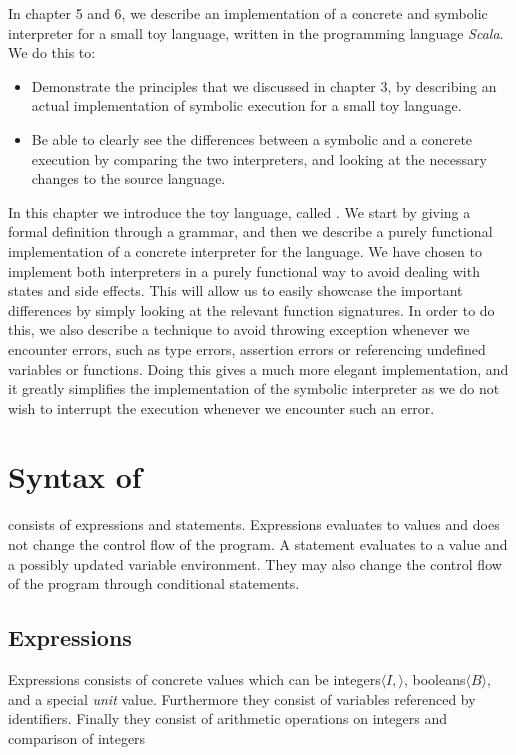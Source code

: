 
In chapter 5 and 6, we describe an implementation of a concrete and symbolic interpreter for a small toy language, written in the programming language \textsl{Scala}. We do this to: 
\begin{itemize}
	\item Demonstrate the principles that we discussed in chapter 3, by describing an actual implementation of symbolic execution for a small toy language.
	\item Be able to clearly see the differences between a symbolic and a concrete execution by comparing the two interpreters, and looking at the necessary changes to the source language. 
\end{itemize} 

In this chapter we introduce the toy language, called \explanguage. We start by giving a formal definition through a grammar, and then we describe a purely functional implementation of a concrete interpreter for the language. We have chosen to implement both interpreters in a purely functional way to avoid dealing with states and side effects. This will allow us to easily showcase the important differences by simply looking at the relevant function signatures. In order to do this, we also describe a technique to avoid throwing exception whenever we encounter errors, such as type errors, assertion errors or referencing undefined variables or functions. Doing this gives a much more elegant implementation, and it greatly simplifies the implementation of the symbolic interpreter as we do not wish to interrupt the execution whenever we encounter such an error.

\section{Syntax of \explanguage}

\explanguage consists of expressions and statements. Expressions evaluates to values and does not change the control flow of the program. A statement evaluates to a value and a possibly updated variable environment. They may also change the control flow of the program through conditional statements.
 

\subsection{Expressions}


Expressions consists of concrete values which can be integers$\langle I, \rangle$, booleans$\langle B \rangle$, and a special \textsl{unit} value. Furthermore they consist of variables referenced by identifiers. Finally they consist of arithmetic operations on integers and comparison of integers 

